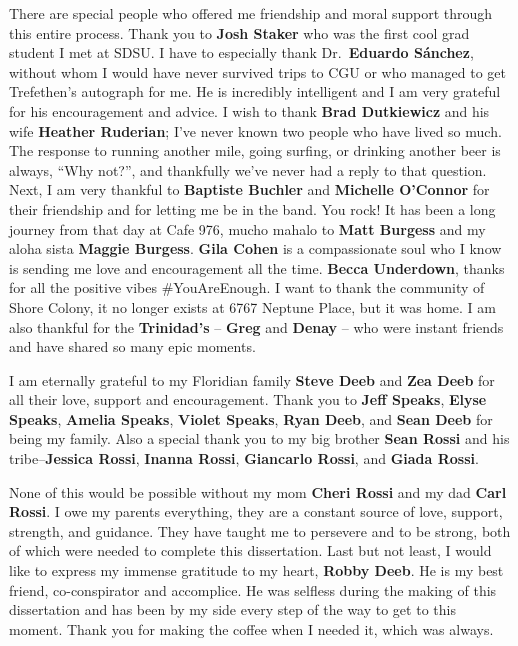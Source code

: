 \documentclass[11pt]{Thesis} %
\begin{document}
{There are special people who offered me friendship and moral support through this entire process.  Thank you to {\bf Josh Staker} who was the first cool grad student I met at SDSU.  I have to especially thank Dr.~{\bf Eduardo S\'{a}nchez}, without whom I would have never survived trips to CGU or who managed to get Trefethen's autograph for me.  He is incredibly intelligent and I am very grateful for his encouragement and advice.  I wish to thank {\bf Brad Dutkiewicz} and his wife {\bf Heather Ruderian}; I've never known two people who have lived so much.  The response to running another mile, going surfing, or drinking another beer is always, ``Why not?'', and thankfully we've never had a reply to that question.  Next, I am very thankful to {\bf Baptiste Buchler} and {\bf Michelle O'Connor} for their friendship and for letting me be in the band.  You rock!  It has been a long journey from that day at Cafe 976, mucho mahalo to {\bf Matt Burgess} and my aloha sista {\bf Maggie Burgess}.  {\bf Gila Cohen} is a compassionate soul who I know is sending me love and encouragement all the time.  {\bf Becca Underdown}, thanks for all the positive vibes \#YouAreEnough.  I want to thank the community of Shore Colony, it no longer exists at 6767 Neptune Place, but it was home.  I am also thankful for the {\bf Trinidad's} -- {\bf Greg} and {\bf Denay} -- who were instant friends and have shared so many epic moments.

I am eternally grateful to my Floridian family {\bf Steve Deeb} and {\bf Zea Deeb} for all their love, support and encouragement.  Thank you to {\bf Jeff Speaks}, {\bf Elyse Speaks}, {\bf Amelia Speaks}, {\bf Violet Speaks}, {\bf Ryan Deeb}, and {\bf Sean Deeb} for being my family.  Also a special thank you to my big brother {\bf Sean Rossi} and his tribe--{\bf Jessica Rossi}, {\bf Inanna Rossi}, {\bf Giancarlo Rossi}, and {\bf Giada Rossi}.  

None of this would be possible without my mom {\bf Cheri Rossi} and my dad {\bf Carl Rossi}.  I owe my parents everything, they are a constant source of love, support, strength, and guidance.  They have taught me to persevere and to be strong, both of which were needed to complete this dissertation.  Last but not least, I would like to express my immense gratitude to my heart, {\bf Robby Deeb}.  He is my best friend, co-conspirator and accomplice.  He was selfless during the making of this dissertation and has been by my side every step of the way to get to this moment.  Thank you for making the coffee when I needed it, which was always.
}
\end{document}
